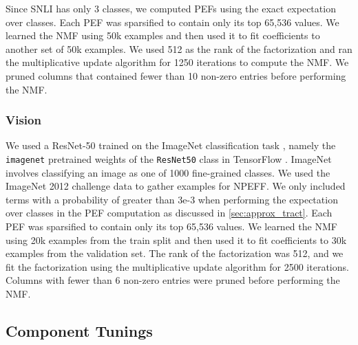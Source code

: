 \documentclass[dvipsnames]{article}
\begin{document}
Since SNLI has only 3 classes, we computed PEFs using the exact expectation over classes.
Each PEF was sparsified to contain only its top 65,536 values.
We learned the NMF using 50k examples and then used it to fit coefficients to another set of 50k examples.
We used 512 as the rank of the factorization and ran the multiplicative update algorithm for 1250 iterations to compute the NMF.
We pruned columns that contained fewer than 10 non-zero entries before performing the NMF.

\subsubsection{Vision}
We used a ResNet-50 \citep{he2016deep} trained on the ImageNet classification task \citep{imagenet}, namely the \texttt{imagenet} pretrained weights of the \texttt{ResNet50} class in TensorFlow \citep{abadi2016tensorflow}.
ImageNet involves classifying an image as one of 1000 fine-grained classes.
We used the ImageNet 2012 challenge data to gather examples for NPEFF.
We only included terms with a probability of greater than 3e-3 when performing the expectation over classes in the PEF computation as discussed in \cref{sec:approx_tract}.
Each PEF was sparsified to contain only its top 65,536 values.
We learned the NMF using 20k examples from the train split and then used it to fit coefficients to 30k examples from the validation set.
The rank of the factorization was 512, and we fit the factorization using the multiplicative update algorithm for 2500 iterations.
Columns with fewer than 6 non-zero entries were pruned before performing the NMF.


\subsection{Component Tunings}
\end{document}
